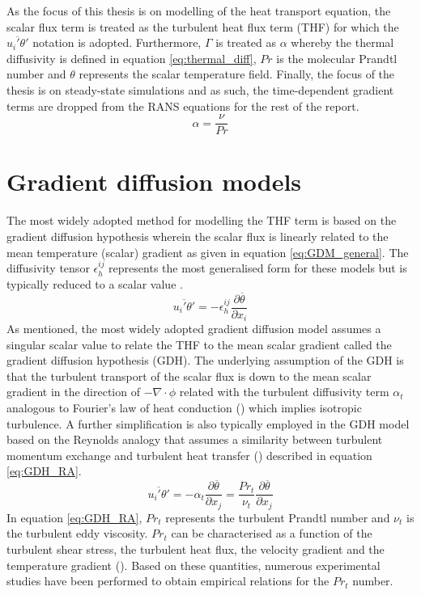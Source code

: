 As the focus of this thesis is on modelling of the heat transport equation, the scalar flux term is treated as the turbulent heat flux term (THF) for which the $\overline{u_{i}'\theta'}$ notation is adopted. Furthermore, $\Gamma$ is treated as $\alpha$ whereby the thermal diffusivity is defined in equation \ref{eq:thermal_diff}, $Pr$ is the molecular Prandtl number and $\theta$ represents the scalar temperature field. Finally, the focus of the thesis is on steady-state simulations and as such, the time-dependent gradient terms are dropped from the RANS equations for the rest of the report. 
\begin{equation}
\label{eq:thermal_diff}
\alpha = \frac{\nu}{Pr}
\end{equation}
\section{Gradient diffusion models}
The most widely adopted method for modelling the THF term is based on the gradient diffusion hypothesis wherein the scalar flux is linearly related to the mean temperature (scalar) gradient as given in equation \ref{eq:GDM_general}. The diffusivity tensor $\epsilon^{ij}_{h}$ represents the most generalised form for these models but is typically reduced to a scalar value \cite{Grotzbach2013}.
\begin{equation}
\label{eq:GDM_general}
\overline{u_{i}'\theta'} = -\epsilon^{ij}_{h}\frac{\partial\overline{\theta}}{\partial x_{i}}
\end{equation}
As mentioned, the most widely adopted gradient diffusion model assumes a singular scalar value to relate the THF to the mean scalar gradient called the gradient diffusion hypothesis (GDH). The underlying assumption of the GDH is that the turbulent transport of the scalar flux is down to the mean scalar gradient in the direction of $-\nabla \cdot \phi$ related with the turbulent diffusivity term $\alpha_{t}$ analogous to Fourier's law of heat conduction (\cite{Pope2000}) which implies isotropic turbulence. A further simplification is also typically employed in the GDH model based on the Reynolds analogy that assumes a similarity between turbulent momentum exchange and turbulent heat transfer (\cite{Bartosiewicz2019}) described in equation \ref{eq:GDH_RA}. 
\begin{equation}
\label{eq:GDH_RA}
\overline{u_{i}' \theta'} = -\alpha_{t} \frac{\partial \overline{\theta}}{\partial x_{j}} = \frac{Pr_{t}}{\nu_{t}}  \frac{\partial \overline{\theta}}{\partial x_{j}} 
\end{equation}
In equation \ref{eq:GDH_RA}, $Pr_{t}$ represents the turbulent Prandtl number and $\nu_{t}$ is the turbulent eddy viscosity. $Pr_{t}$ can be characterised as a function of the turbulent shear stress, the turbulent heat flux, the velocity gradient and the temperature gradient (\cite{Kays1994}). Based on these quantities, numerous experimental studies have been performed to obtain empirical relations for the $Pr_{t}$ number.


